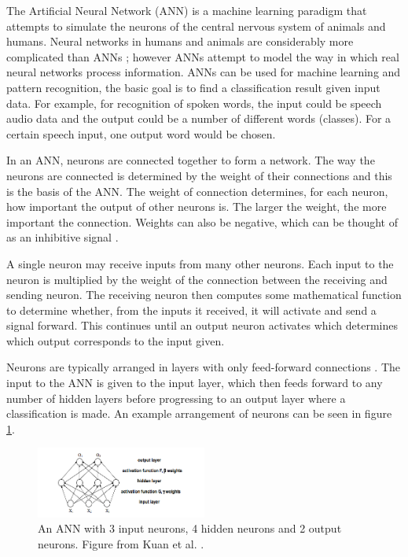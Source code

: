 The Artificial Neural Network (ANN) is a machine learning paradigm that attempts to simulate the neurons of the central nervous system of animals and humans. Neural networks in humans and animals are considerably more complicated than ANNs \cite{Graupe2013}; however ANNs attempt to model the way in which real neural networks process information. ANNs can be used for machine learning and pattern recognition, the basic goal is to find a classification result given input data. For example, for recognition of spoken words, the input could be speech audio data and the output could be a number of different words (classes). For a certain speech input, one output word would be chosen. 

In an ANN, neurons are connected together to form a network. The way the neurons are connected is determined by the weight of their connections and this is the basis of the ANN. The weight of connection determines, for each neuron, how important the output of other neurons is. The larger the weight, the more important the connection. Weights can also be negative, which can be thought of as an inhibitive signal \cite{Graupe2013}.

A single neuron may receive inputs from many other neurons. Each input to the neuron is multiplied by the weight of the connection between the receiving and sending neuron. The receiving neuron then computes some mathematical function to determine whether, from the inputs it received, it will activate and send a signal forward. This continues until an output neuron activates which determines which output corresponds to the input given. 

Neurons are typically arranged in layers with only feed-forward connections \cite{Kuan}. The input to the ANN is given to the input layer, which then feeds forward to any number of hidden layers before progressing to an output layer where a classification is made. An example arrangement of neurons can be seen in figure \ref{ANN}. 

\begin{figure}[ht!]
\begin{center}
\leavevmode
\includegraphics[width=0.5\textwidth]{images/ANN.png}
\end{center}
\caption[Example Artificial Neural Network]{An ANN with 3 input neurons, 4 hidden neurons and 2 output neurons. Figure from Kuan et al. \cite{Kuan}.}
\label{ANN}
\end{figure}

